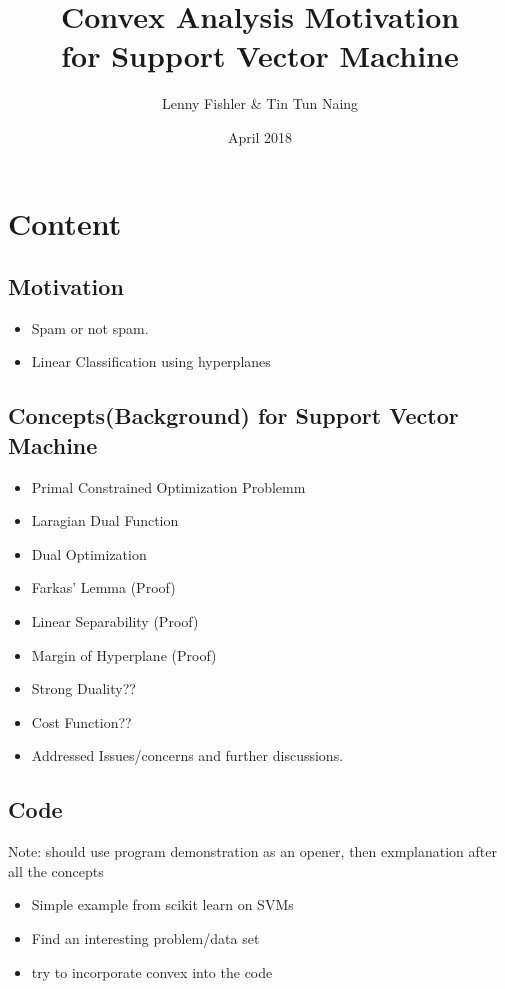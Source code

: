 \documentclass{article}
\title{Convex Analysis Motivation\\ for Support Vector Machine}
\author{Lenny Fishler \& Tin Tun Naing}
\date{April 2018}
\begin{document}
\maketitle


\section{Content}
\subsection{Motivation}
\begin{itemize}
\item Spam or not spam.
\item Linear Classification using hyperplanes 
\end{itemize}
\subsection{Concepts(Background) for Support Vector Machine}
\begin{itemize}
\item Primal Constrained Optimization Problemm
\item Laragian Dual Function
\item Dual Optimization
\item Farkas' Lemma (Proof)
\item Linear Separability (Proof)
\item Margin of Hyperplane (Proof)
\item Strong Duality??
\item Cost Function??
\item Addressed Issues/concerns and further discussions.
\end{itemize}
\subsection{Code}
Note: should use program demonstration as an opener, then exmplanation after all the concepts
\begin{itemize}
\item Simple example from scikit learn on SVMs
\item Find an interesting problem/data set
\item try to incorporate convex into the code
\end{itemize}
\end{document}
